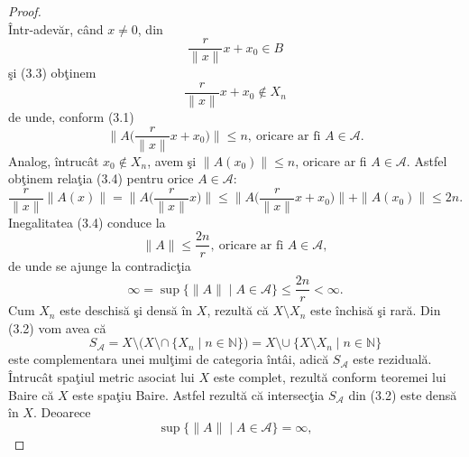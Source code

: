 \documentclass[a4paper,openany,12pt]{report}
\begin{document}
\begin{proof}
\begin{equation}
\end{equation}
\^ Intr-adev\u ar, c\^ and $x \neq 0$, din 
\begin{equation*}\frac{r}{\|x\|}x + x_0 \in B
\end{equation*}
\c si (3.3) ob\c tinem 
\begin{equation*}\frac{r}{\|x\|}x + x_0 \notin X_n
\end{equation*}
de unde, conform (3.1)
\begin{equation*}
\Big\| A\Big(\frac{r}{\|x\|}x + x_0\Big)\Big\| \leq n, \: \text{oricare ar fi } A\in\mathcal{A}.
\end{equation*}
Analog, \^ intruc\^ at $x_0 \notin X_n$, avem \c si $\|A(x_0)\| \leq n$, oricare ar fi $A \in \mathcal{A}$.
\newline
\newline Astfel ob\c tinem rela\c tia (3.4) pentru orice $A \in \mathcal{A}$:
\begin{equation*}
\frac{r}{\|x\|} \|A(x)\| = \Big\| A\Big(\frac{r}{\|x\|}x\Big) \Big\| \leq \Big\| A\Big(\frac{r}{\|x\|}x + x_0\Big)\Big\| + \|A(x_0)\| \leq 2n.
\end{equation*}
Inegalitatea (3.4) conduce la
\begin{equation*}
\|A\| \leq \frac{2n}{r},\: \text{oricare ar fi } A \in \mathcal{A},
\end{equation*}
de unde se ajunge la contradic\c tia
\begin{equation*}
\infty = \sup\{\|A\|\mid A\in \mathcal{A}\} \leq \frac{2n}{r} < \infty.
\end{equation*}
\newline
Cum $X_n$ este deschis\u a \c si dens\u a \^ in $X$, rezult\u a c\u a $X \setminus X_n$ este \^ inchis\u a \c si rar\u a. Din (3.2) vom avea c\u a
\begin{equation*}
S_{\mathcal{A}} = X \setminus \big(X \setminus \cap \: \{X_n \mid n\in \mathbb{N} \}\big) = X \setminus \cup\: \{X\setminus X_n \mid n \in \mathbb{N}\}
\end{equation*}
este complementara unei mul\c timi de categoria \^ int\^ ai, adic\u a $S_{\mathcal{A}}$ este rezidual\u a.
\newline
\^ Intruc\^ at spa\c tiul metric asociat lui $X$ este complet, rezult\u a conform teoremei lui Baire c\u a $X$ este spa\c tiu Baire. Astfel rezult\u a c\u a intersec\c tia $S_{\mathcal{A}}$ din (3.2) este dens\u a \^ in $X$. Deoarece 
\begin{equation*}
\sup\big\{ \|A\| \mid A \in \mathcal{A}\big\} = \infty,
\end{equation*}

\end{proof}
\end{document}
